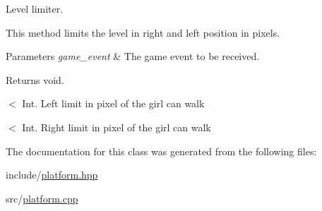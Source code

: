 Level limiter. 

This method limits the level in right and left position in pixels.


\begin{DoxyParams}{Parameters}
{\em game\+\_\+event} & The game event to be received.\\
\hline
\end{DoxyParams}
\begin{DoxyReturn}{Returns}
void. 
\end{DoxyReturn}
$<$ Int. Left limit in pixel of the girl can walk

$<$ Int. Right limit in pixel of the girl can walk 

The documentation for this class was generated from the following files\+:\begin{DoxyCompactItemize}
\item 
include/\hyperlink{platform_8hpp}{platform.\+hpp}\item 
src/\hyperlink{platform_8cpp}{platform.\+cpp}\end{DoxyCompactItemize}
